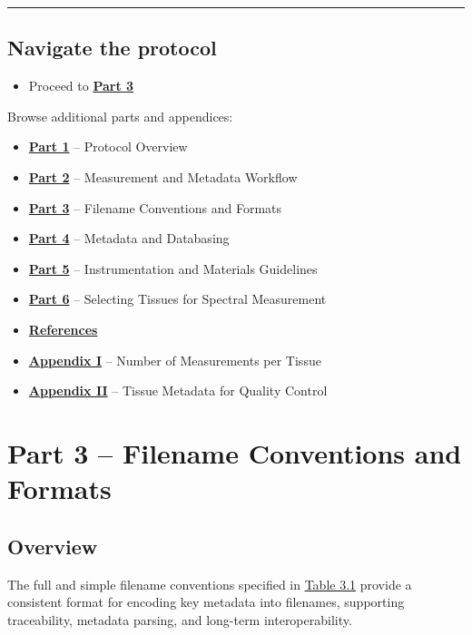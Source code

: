 \documentclass[
  letterpaper,
  DIV=11,
  numbers=noendperiod]{scrreprt}
\providecommand{\tightlist}{%
  \setlength{\itemsep}{0pt}\setlength{\parskip}{0pt}}
\begin{document}
\begin{center}\rule{0.5\linewidth}{0.5pt}\end{center}

\section{Navigate the protocol}\label{navigate-the-protocol-2}

\begin{itemize}
\tightlist
\item
  Proceed to \hyperref[part3]{\textbf{Part 3}}
\end{itemize}

Browse additional parts and appendices:

\begin{itemize}
\tightlist
\item
  \hyperref[part1]{\textbf{Part 1}} -- Protocol Overview
\item
  \hyperref[part2]{\textbf{Part 2}} -- Measurement and Metadata Workflow
\item
  \hyperref[part3]{\textbf{Part 3}} -- Filename Conventions and Formats
\item
  \hyperref[part4]{\textbf{Part 4}} -- Metadata and Databasing
\item
  \hyperref[part5]{\textbf{Part 5}} -- Instrumentation and Materials
  Guidelines
\item
  \hyperref[part6]{\textbf{Part 6}} -- Selecting Tissues for Spectral
  Measurement
\item
  \hyperref[references]{\textbf{References}}
\item
  \hyperref[app1]{\textbf{Appendix I}} -- Number of Measurements per
  Tissue
\item
  \hyperref[app2]{\textbf{Appendix II}} -- Tissue Metadata for Quality
  Control
\end{itemize}


\chapter{Part 3 -- Filename Conventions and
Formats}\label{part-3-filename-conventions-and-formats}

\section{Overview}\label{part3}

The full and simple filename conventions specified in
\hyperref[tbl-3-1]{Table 3.1} provide a consistent format for encoding
key metadata into filenames, supporting traceability, metadata parsing,
and long-term interoperability.
\end{document}
